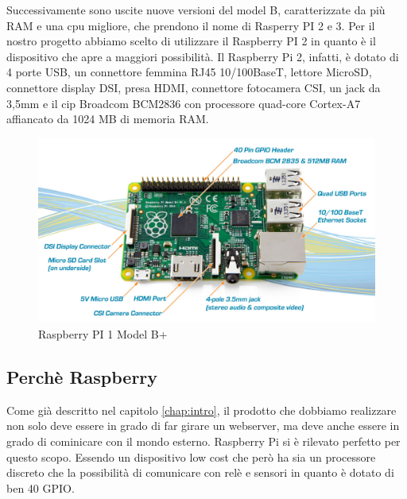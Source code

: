 Successivamente sono uscite nuove versioni del model B, caratterizzate da più RAM e una cpu migliore, che prendono il nome di Rasperry PI 2 e 3.
Per il nostro progetto abbiamo scelto di utilizzare il Raspberry PI 2 in
quanto è il dispositivo che apre a maggiori possibilità. Il Raspberry Pi 2,
infatti, è dotato di 4 porte USB, un connettore femmina RJ45
10/100BaseT, lettore MicroSD, connettore display DSI, presa HDMI,
connettore fotocamera CSI, un jack da 3,5mm e il cip Broadcom
BCM2836 con processore quad-core Cortex-A7 affiancato da 1024 MB di
memoria RAM.
\begin{figure}[h]
\centering
\includegraphics[scale=0.3]{Immagini/raspberry.png}
\caption{Raspberry PI 1 Model B+}
\end{figure}

\subsection{Perchè Raspberry}

Come già descritto nel capitolo \ref{chap:intro}, il prodotto che dobbiamo realizzare non solo deve essere in grado di far girare un webserver, ma deve anche essere in grado di cominicare
con il mondo esterno. Raspberry Pi si è rilevato perfetto per questo scopo.
Essendo un dispositivo low cost che però ha sia un processore discreto che la possibilità
di comunicare con relè e sensori in quanto è dotato di ben 40 GPIO.